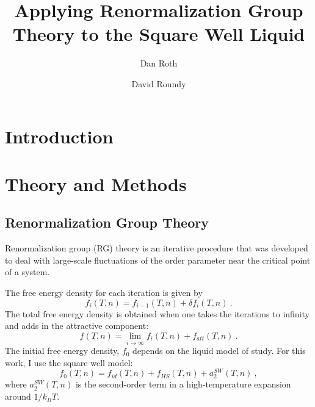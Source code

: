 \documentclass[letterpaper,twocolumn,amsmath,amssymb,prb]{revtex4-1}
\newcommand{\kt}{k_BT}
\begin{document}
\title{Applying Renormalization Group Theory to the Square Well Liquid}

\author{Dan Roth}

\author{David Roundy}

\begin{abstract}
{}

\end{abstract}

\maketitle

\section{Introduction}

\section{Theory and Methods}

\subsection{Renormalization Group Theory}
Renormalization group (RG) theory is an iterative procedure that was
developed to deal with large-scale fluctuations of the order parameter
near the critical point of a system.

The free energy density for each iteration is given by
\begin{equation}
  f_i(T,n) = f_{i-1}(T,n) + \delta f_i(T,n)\ .
\end{equation}
The total free energy density is obtained when one takes the
iterations to infinity and adds in the attractive component:
\begin{equation}
  f(T,n) = \lim_{i \to \infty} f_i(T,n) + f_{att}(T,n)\ .
\end{equation}
The initial free energy density, $f_0$ depends on the liquid model of study. For this work, I use the square well model:
\begin{equation}
  f_0(T,n) = f_{id}(T,n) + f_{HS}(T,n) + a_2^{SW}(T,n)\ ,
\end{equation}
where $a_2^{SW}(T,n)$ is the second-order term in a high-temperature expansion around $1/\kt$.~\cite{Gil-Villegas97}
\end{document}
